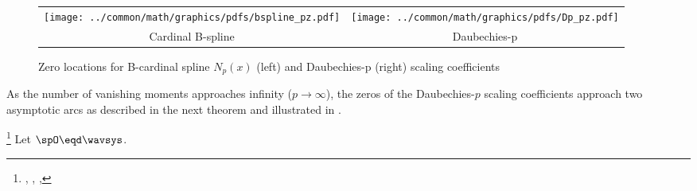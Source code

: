 \begin{figure}
  \centering%
  \begin{tabular*}{\textwidth-40mm}{@{\extracolsep{\fill}}cc}%
    \texttt{[image: ../common/math/graphics/pdfs/bspline\_pz.pdf]}&\texttt{[image: ../common/math/graphics/pdfs/Dp\_pz.pdf]}\\%
    Cardinal B-spline&Daubechies-p%
  \end{tabular*}%
  \caption{
     Zero locations for B-cardinal spline $N_p(x)$ (left) and
     Daubechies-p (right) scaling coefficients
     \label{fig:Dp_limits}
     }
\end{figure}

As the number of vanishing moments approaches infinity ($p\to\infty$),
the zeros of the Daubechies-$p$ scaling coefficients approach two
asymptotic arcs as described in the next theorem and illustrated in
.
\begin{lemma}
\footnote{
  ,
  ,
  ,
  }
\label{lem:QzQz_zeros}
Let $\spO\eqd\wavsys$.
\end{lemma}

